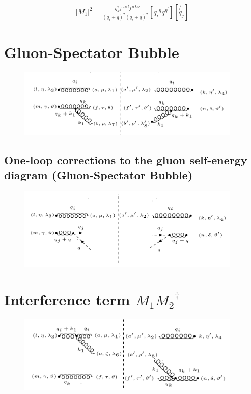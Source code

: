 \begin{equation}
\begin{split}
|M_1|^2= \frac{-g_s^2 f^{\:a\:o\:l} f^{\:a\:k\:o} }{(q_i +q)^2 (q_i +q)^2}[{q_i}^{\eta}  {q}^{{\eta}^{\prime}}][\not{q_j}]
\end{split}
\end{equation}




\pagebreak

\section{Gluon-Spectator Bubble}
\begin{figure}[ht!]
\centering
\includegraphics[width=0.95\textwidth]{images/GG/M2Squer}
\end{figure}


\pagebreak
\subsection{One-loop corrections to the gluon self-energy diagram (Gluon-Spectator Bubble)}
\begin{figure}[h!]
\centering
\includegraphics[width=0.95\textwidth]{images/GG/GhostM2.png}
\end{figure}

\section{Interference term $M_1 {M_2}^{\dagger}$}
\begin{figure}[h!]
\centering
\includegraphics[width=0.95\textwidth]{images/GG/M1M2Dagger.png}
\end{figure}
\pagebreak

